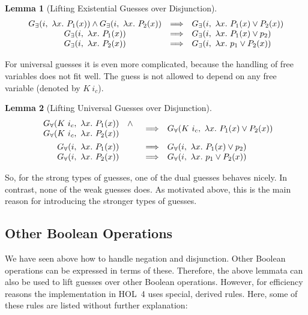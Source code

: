 \documentclass[a4paper,12pt,DIV=12,oneside]{scrbook}
\newtheorem{lemma}{Lemma}[section]
\theoremstyle{definition}
\theoremstyle{remark}
\newcommand{\GE}{\ensuremath{G_\exists}}
\newcommand{\GU}{\ensuremath{G_\forall}}
\begin{document}
\begin{lemma}[Lifting Existential Guesses over Disjunction]\label{lemma_guesses_lift_disj_E}
\[
\begin{array}{c@{\quad}c@{\quad}l}
\GE(i,\ \lambda x.\ P_1(x)) \wedge \GE(i,\ \lambda x.\ P_2(x)) & \Longrightarrow & \GE(i,\ \lambda x.\ P_1(x) \vee P_2(x)) \\
\GE(i,\ \lambda x.\ P_1(x)) & \Longrightarrow & \GE(i,\ \lambda x.\ P_1(x) \vee p_2) \\
\GE(i,\ \lambda x.\ P_2(x)) & \Longrightarrow & \GE(i,\ \lambda x.\ p_1 \vee P_2(x))
\end{array}
\]
\end{lemma}

For universal guesses it is even more complicated, because the handling of free variables does not fit well.
The guess is not allowed to depend on any free variable (denoted by $K\ i_c$).
\begin{lemma}[Lifting Universal Guesses over Disjunction]\label{lemma_guesses_lift_disj_A}
\[
\begin{array}{c@{\quad}c@{\quad}l}
\begin{array}{cl}
\GU(K\ i_c,\ \lambda x.\ P_1(x)) & \wedge \\
\GU(K\ i_c,\ \lambda x.\ P_2(x))
\end{array} & \Longrightarrow & \GU(K\ i_c,\ \lambda x.\ P_1(x) \vee P_2(x)) \\[1em]
\GU(i,\ \lambda x.\ P_1(x)) & \Longrightarrow & \GU(i,\ \lambda x.\ P_1(x) \vee p_2) \\
\GU(i,\ \lambda x.\ P_2(x)) & \Longrightarrow & \GU(i,\ \lambda x.\ p_1 \vee P_2(x))
\end{array}
\]
\end{lemma}

So, for the strong types of guesses, one of the dual guesses behaves
nicely.  In contrast, none of the weak guesses does. As motivated
above, this is the main reason for introducing the stronger types of
guesses.


\subsection{Other Boolean Operations}

We have seen above how to handle negation and disjunction. Other Boolean operations can be expressed in terms of these.
Therefore, the above lemmata can also be used to lift guesses over other Boolean operations. However, for efficiency
reasons the implementation in HOL~4 uses special, derived rules. Here, some of these rules are listed without further explanation:
\end{document}
